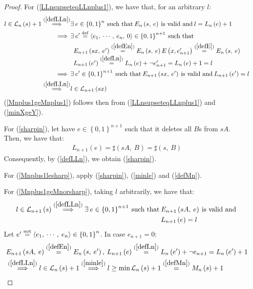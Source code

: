 \documentclass[a4paper,9pt,leqno]{article}
\renewcommand{\=}{\protect\nobreakdash-\hspace{0pt}}
\renewcommand{\~}{\protect\nobreakdash--\hspace{0pt}}
\newcommand{\textpar}{%
    \par\noindent\newline}
\theoremstyle{plain}
\theoremstyle{definition}
\theoremstyle{remark}
\newcommand{\impll}{\:\:\Longrightarrow\:\:}
\newcommand{\impl}{\impll}%
\newcommand{\parref}[1]{(\ref{#1})}
\newcommand{\by}[1]{{#1}}
\newcommand{\bydef}{\by{def}}
\newcommand{\bynot}{\by{not}}
\newcommand{\symby}[2]{\stackrel{#1}{{#2}}}
\newcommand{\symbyrm}[2]{\symby{{\rm\scriptstyle{#1}}}{#2}}
\newcommand{\implby}[1]{\symbyrm{#1}{\impll}}
\newcommand{\implbyref}[1]{\implby{\parref{#1}}}
\newcommand{\eqby}[1]{\symbyrm{#1}{=}}
\newcommand{\eqbydef}{\eqby{\bydef}}
\newcommand{\eqbyref}[1]{\eqby{\parref{#1}}}
\newcommand{\eqbynot}{\eqby{\bynot}}
\newcommand{\txt}[1]{\:\text{#1}\:}
\newcommand{\mc}{,\:}
\newcommand{\ms}{\:}
\newcommand{\lp}{\left(}
\newcommand{\lc}{\left\{}
\newcommand{\rp}{\right)}
\newcommand{\rc}{\right\}}
\newcommand{\la}{\left\langle}
\newcommand{\ra}{\right\rangle}
\begin{document}
\begin{proof}
For \parref{LLnsupseteqLLnplus1}, we have that, for an arbitrary $l$:
%
\begin{align*}
l \in \mathcal{L}_n \lp s \rp + 1
\implbyref{defLLn} & \exists\ms e \in \lc 0, 1 \rc^n \txt{such that}
    E_n \lp s\mc e \rp \txt{is valid and} l = L_n \lp e \rp + 1 \\
\impl & \exists\ms e'\eqbydef \la e_1\mc\cdots\mc e_n\mc 0\ra \in \lc 0, 1 \rc^{n+1} \txt{such that} \\
& \begin{array}{l}
    E_{n+1} \lp s x\mc e' \rp
      \eqbyref{defEn} E_n \lp s\mc e \rp E\lp x, e'_{n+1} \rp
      \eqbyref{defE} E_n \lp s\mc e \rp \\
    L_{n+1} \lp e' \rp \eqbyref{defLn} L_n \lp e \rp + \neg e'_{n+1} = L_n \lp e\rp + 1 = l
  \end{array} \\
\impl & \exists\ms e'\in \lc 0, 1 \rc^{n+1} \txt{such that}
  E_{n+1} \lp s x\mc e' \rp \txt{is valid and}
  L_{n+1} \lp e' \rp = l \\
\implbyref{defLLn} & l \in \mathcal{L}_{n+1} \lp s x \rp
\end{align*}
%
\parref{Mnplus1geMnplus1} follows then from \parref{LLnsupseteqLLnplus1} and
\parref{minXgeY}.
\textpar
For \parref{sharpin}, let have $e \in\lc 0, 1\rc^{n+1}$ such that it
deletes all $B$s from $s A$. Then, we have that:
%
\begin{align*}
L_{n+1}\lp e\rp = \sharp\lp s A\mc B\rp = \sharp\lp s\mc B\rp
\end{align*}
Consequently, by \parref{defLLn}, we obtain \parref{sharpin}.
\textpar
For \parref{Mnplus1lesharp}, apply \parref{sharpin}, \parref{minle} and \parref{defMn}. 
\textpar
For \parref{Mnplus1geMnorsharp}, taking $l$ arbitrarily, we have that:
%
\begin{align*}
l \in \mathcal{L}_{n+1}\lp s\rp
  \implbyref{defLLn} \exists\ms e\in\lc 0, 1\rc^{n+1} \txt{such that}
    & E_{n+1}\lp s A\mc e\rp \txt{is valid and} \\
    & L_{n+1}\lp e\rp = l
\end{align*}
%
Let $e' \eqbynot \la e_1\mc\cdots\mc e_n\ra\in\lc 0, 1\rc^n$.
In case $e_{n+1} = 0$:
%
\begin{align*}
& E_{n+1}\lp s A\mc e\rp \eqbyref{defEn} E_n\lp s\mc e'\rp\mc
  L_{n+1}\lp e\rp \eqbyref{defLn} L_n\lp e'\rp + \neg e_{n+1} = L_n\lp e'\rp + 1\\
& \implbyref{defLLn} l \in \mathcal{L}_n\lp s\rp + 1
  \implbyref{minle} l \ge \min\mathcal{L}_n\lp s\rp + 1 \eqbyref{defMn} M_n\lp s\rp + 1

\end{align*}
\end{proof}
\end{document}
